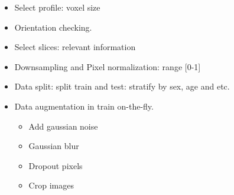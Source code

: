  
 
 
 
 
\begin{itemize}
    \item Select profile: voxel size
    \item Orientation checking.
    \item Select slices: relevant information
    \item Downsampling and Pixel normalization: range [0-1]
    \item Data split: split train and test: stratify by sex, age and etc.
    \item Data augmentation in train on-the-fly.
    \begin{itemize}
        \item Add gaussian noise
        \item Gaussian blur
        \item Dropout pixels
        \item Crop images
    \end{itemize}
\end{itemize}
\fi